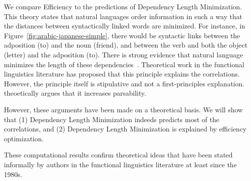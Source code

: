 \documentclass[9pt,twocolumn,twoside,lineno]{pnas-new}
\newcommand{\key}[1]{\textbf{#1}}
\begin{document}
We compare Efficiency to the predictions of Dependency Length Minimization.
This theory states that natural languages order information in such a way that the distances between syntactically linked words are minimized.
For instance, in Figure~\ref{fig:arabic-japanese-simple}, there would be syntactic links between the adposition (to) and the noun (friend), and between the verb and both the object (letter) and the adposition (to).
There is strong evidence that natural language minimizes the length of these dependencies~\cite{ferrericancho2004euclidean,liu2008dependency,gildea2010grammars,futrell2015largescale}.
Theoretical work in the functional linguistics literature has proposed that this principle explains the correlations.
However, the principle itself is stipulative and not a first-principles explanation.
\cite{hawkins1994performance} theoetically argues that it increases  parsability.

However, these arguments have been made on a theoretical basis.
We will show that (1) Dependency Length Minimization indeeds predicts most of the correlations, and (2) Dependency Length Minimization is explained by efficiency optimization.

These computational results confirm theoretical ideas  that have been stated informally by authors in the functional linguistics literature at least since the 1980s. 




\showmatmethods{} %


\showacknow{} %


%
%

\end{document}
